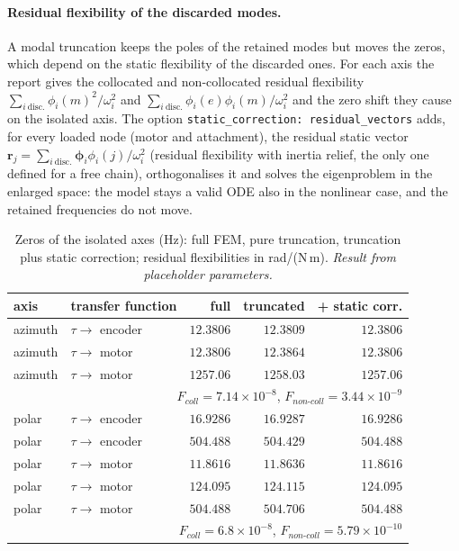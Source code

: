 \documentclass[10pt,a4paper]{article}
\numberwithin{equation}{section}
\begin{document}
\paragraph{Residual flexibility of the discarded modes.} A modal truncation keeps the poles of the retained modes but moves the zeros, which depend on the static flexibility of the discarded ones. For each axis the report gives the collocated and non-collocated residual flexibility $\sum_{i\ \text{disc.}}\phi_i(m)^2/\omega_i^2$ and $\sum_{i\ \text{disc.}}\phi_i(e)\phi_i(m)/\omega_i^2$ and the zero shift they cause on the isolated axis. The option \texttt{static\_correction: residual\_vectors} adds, for every loaded node (motor and attachment), the residual static vector $\mathbf r_j = \sum_{i\ \text{disc.}}\boldsymbol\phi_i\phi_i(j)/\omega_i^2$ (residual flexibility with inertia relief, the only one defined for a free chain), orthogonalises it and solves the eigenproblem in the enlarged space: the model stays a valid ODE also in the nonlinear case, and the retained frequencies do not move.
\begin{table}[H]\centering\small
\caption{Zeros of the isolated axes (Hz): full FEM, pure truncation, truncation plus static correction; residual flexibilities in rad/(N\,m). \emph{Result from placeholder parameters.}}\label{tab:modal_zeros}
\begin{tabular}{llrrr}\toprule
axis & transfer function & full & truncated & + static corr. \\ \midrule
azimuth & $\tau\to$ encoder & $12.3806$ & $12.3809$ & $12.3806$ \\
azimuth & $\tau\to$ motor & $12.3806$ & $12.3864$ & $12.3806$ \\
azimuth & $\tau\to$ motor & $1257.06$ & $1258.03$ & $1257.06$ \\
\multicolumn{5}{r}{\footnotesize $F_{coll} = 7.14\times10^{-8}$, $F_{non\text{-}coll} = 3.44\times10^{-9}$} \\ \midrule
polar & $\tau\to$ encoder & $16.9286$ & $16.9287$ & $16.9286$ \\
polar & $\tau\to$ encoder & $504.488$ & $504.429$ & $504.488$ \\
polar & $\tau\to$ motor & $11.8616$ & $11.8636$ & $11.8616$ \\
polar & $\tau\to$ motor & $124.095$ & $124.115$ & $124.095$ \\
polar & $\tau\to$ motor & $504.488$ & $504.706$ & $504.488$ \\
\multicolumn{5}{r}{\footnotesize $F_{coll} = 6.8\times10^{-8}$, $F_{non\text{-}coll} = 5.79\times10^{-10}$} \\ \midrule
\bottomrule\end{tabular}\end{table}
\end{document}
